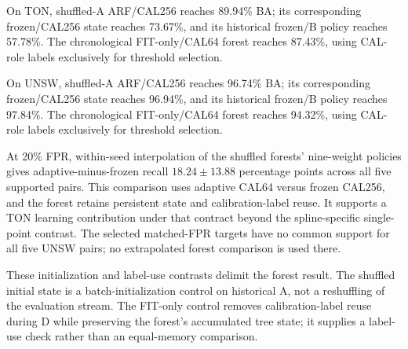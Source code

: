 On TON, shuffled-A ARF/CAL256 reaches 89.94\% BA; its corresponding frozen/CAL256 state reaches 73.67\%, and its historical frozen/B policy reaches 57.78\%. The chronological FIT-only/CAL64 forest reaches 87.43\%, using CAL-role labels exclusively for threshold selection.

On UNSW, shuffled-A ARF/CAL256 reaches 96.74\% BA; its corresponding frozen/CAL256 state reaches 96.94\%, and its historical frozen/B policy reaches 97.84\%. The chronological FIT-only/CAL64 forest reaches 94.32\%, using CAL-role labels exclusively for threshold selection.

At 20\% FPR, within-seed interpolation of the shuffled forests' nine-weight policies gives adaptive-minus-frozen recall $18.24 \pm 13.88$ percentage points across all five supported pairs. This comparison uses adaptive CAL64 versus frozen CAL256, and the forest retains persistent state and calibration-label reuse. It supports a TON learning contribution under that contract beyond the spline-specific single-point contrast. The selected matched-FPR targets have no common support for all five UNSW pairs; no extrapolated forest comparison is used there.

These initialization and label-use contrasts delimit the forest result. The shuffled initial state is a batch-initialization control on historical A, not a reshuffling of the evaluation stream. The FIT-only control removes calibration-label reuse during D while preserving the forest's accumulated tree state; it supplies a label-use check rather than an equal-memory comparison.
